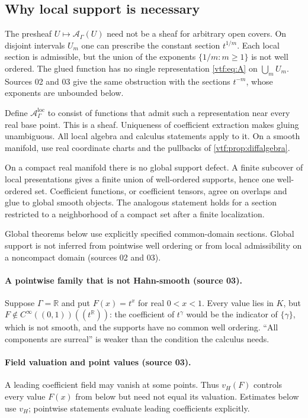 \documentclass[11pt,letterpaper]{article}
\theoremstyle{definition}
\theoremstyle{remark}
\newcommand{\R}{\mathbb R}\newcommand{\C}{\mathbb C}
\newcommand{\A}{\mathscr A}\newcommand{\OO}{\mathcal O}\newcommand{\mm}{\mathfrak m}
\newcommand{\vH}{v_{\!H}}
\begin{document}
\subsection{Why local support is necessary}

The presheaf $U\mapsto\A_\Gamma(U)$ need not be a sheaf for arbitrary open
covers. On disjoint intervals $U_m$ one can prescribe the constant section
$t^{1/m}$. Each local section is admissible, but the union of the exponents
$\{1/m:m\ge1\}$ is not well ordered. The glued function has no single
representation \eqref{vtf:eq:A} on $\bigcup_mU_m$. Sources 02 and 03 give the
same obstruction with the sections $t^{-m}$, whose exponents are unbounded
below.

Define $\A^{\mathrm{loc}}_\Gamma$ to consist of functions that admit such a
representation near every real base point. This is a sheaf. Uniqueness of
coefficient extraction makes gluing unambiguous. All local algebra and
calculus statements apply to it. On a smooth manifold, use real coordinate
charts and the pullbacks of \cref{vtf:prop:diffalgebra}.

On a compact real manifold there is no global support defect. A finite
subcover of local presentations gives a finite union of well-ordered
supports, hence one well-ordered set. Coefficient functions, or coefficient
tensors, agree on overlaps and glue to global smooth objects. The analogous
statement holds for a section restricted to a neighborhood of a compact set
after a finite localization.

Global theorems below use explicitly specified common-domain sections. Global
support is not inferred from pointwise well ordering or from local
admissibility on a noncompact domain (sources 02 and 03).

\paragraph{A pointwise family that is not Hahn-smooth (source 03).} Suppose
$\Gamma=\R$ and put $F(x)=t^x$ for real $0<x<1$. Every value lies in $K$, but
$F\notin C^\infty((0,1))((t^\R))$: the coefficient of $t^\gamma$ would be the
indicator of $\{\gamma\}$, which is not smooth, and the supports have no common
well ordering. ``All components are surreal'' is weaker than the condition the
calculus needs.

\paragraph{Field valuation and point values (source 03).} A leading coefficient
field may vanish at some points. Thus $\vH(F)$ controls every value $F(x)$ from
below but need not equal its valuation. Estimates below use $\vH$; pointwise
statements evaluate leading coefficients explicitly.
\end{document}
